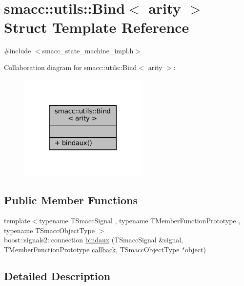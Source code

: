 \hypertarget{structsmacc_1_1utils_1_1Bind}{}\section{smacc\+:\+:utils\+:\+:Bind$<$ arity $>$ Struct Template Reference}
\label{structsmacc_1_1utils_1_1Bind}


{\ttfamily \#include $<$smacc\+\_\+state\+\_\+machine\+\_\+impl.\+h$>$}



Collaboration diagram for smacc\+:\+:utils\+:\+:Bind$<$ arity $>$\+:
\nopagebreak
\begin{figure}[H]
\begin{center}
\leavevmode
\includegraphics[width=183pt]{structsmacc_1_1utils_1_1Bind__coll__graph}
\end{center}
\end{figure}
\subsection*{Public Member Functions}
\begin{DoxyCompactItemize}
\item 
{\footnotesize template$<$typename T\+Smacc\+Signal , typename T\+Member\+Function\+Prototype , typename T\+Smacc\+Object\+Type $>$ }\\boost\+::signals2\+::connection \hyperlink{structsmacc_1_1utils_1_1Bind_aa0f4ba76fbd5fdb865df51b61d4269f3}{bindaux} (T\+Smacc\+Signal \&signal, T\+Member\+Function\+Prototype \hyperlink{sm__ridgeback__barrel__search__2_2servers_2opencv__perception__node_2opencv__perception__node_8cpp_a050e697bd654facce10ea3f6549669b3}{callback}, T\+Smacc\+Object\+Type $\ast$object)
\end{DoxyCompactItemize}


\subsection{Detailed Description}
